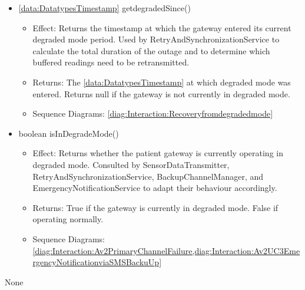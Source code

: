 \begin{description}
\begin{itemize}[noitemsep,nolistsep,leftmargin=-.25cm]
\begin{itemize}[noitemsep,nolistsep]
           \item Sequence Diagrams: \cref{diag:Interaction:Recoveryfromdegradedmode}
        \end{itemize}
      \item \textsf{\ref{data:DatatypesTimestamp} getdegradedSince()}
        \begin{itemize}[noitemsep,nolistsep]
           \item Effect: Returns the timestamp at which the gateway entered its current degraded mode period. Used by RetryAndSynchronizationService to calculate the total duration of the outage and to determine which buffered readings need to be retransmitted.
 
           \item Returns: The \ref{data:DatatypesTimestamp} at which degraded mode was entered. Returns null if the gateway is not currently in degraded mode.
           \item Sequence Diagrams: \cref{diag:Interaction:Recoveryfromdegradedmode}
        \end{itemize}
      \item \textsf{boolean isInDegradeMode()}
        \begin{itemize}[noitemsep,nolistsep]
           \item Effect: Returns whether the patient gateway is currently operating in degraded mode. Consulted by SensorDataTransmitter, RetryAndSynchronizationService, BackupChannelManager, and EmergencyNotificationService to adapt their behaviour accordingly. 
           \item Returns: True if the gateway is currently in degraded mode. False if operating normally.
           \item Sequence Diagrams: \cref{diag:Interaction:Av2PrimaryChannelFailure,diag:Interaction:Av2UC3EmergencyNotificationviaSMSBackuUp}
        \end{itemize}
    \end{itemize}
      \item[Diagrams:] None
    \end{description}

